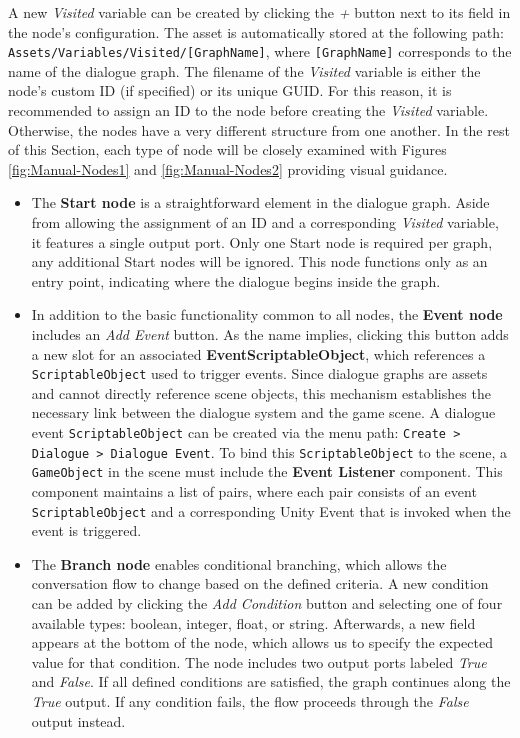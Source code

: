 A new \textit{Visited} variable can be created by clicking the \textit{+} button next to its field in the node's configuration. The asset is automatically stored at the following path: \verb|Assets/Variables/Visited/[GraphName]|, where \verb|[GraphName]| corresponds to the name of the dialogue graph. The filename of the \textit{Visited} variable is either the node’s custom ID (if specified) or its unique GUID. For this reason, it is recommended to assign an ID to the node before creating the \textit{Visited} variable. Otherwise, the nodes have a very different structure from one another. In the rest of this Section, each type of node will be closely examined with Figures \ref{fig:Manual-Nodes1} and \ref{fig:Manual-Nodes2} providing visual guidance.

\begin{itemize}
    \item The \textbf{Start node }is a straightforward element in the dialogue graph. Aside from allowing the assignment of an ID and a corresponding \textit{Visited} variable, it features a single output port. Only one Start node is required per graph, any additional Start nodes will be ignored. This node functions only as an entry point, indicating where the dialogue begins inside the graph.
    \item In addition to the basic functionality common to all nodes, the \textbf{Event node} includes an \textit{Add Event} button. As the name implies, clicking this button adds a new slot for an associated \textbf{EventScriptableObject}, which references a \verb|ScriptableObject| used to trigger events. Since dialogue graphs are assets and cannot directly reference scene objects, this mechanism establishes the necessary link between the dialogue system and the game scene. A dialogue event \verb|ScriptableObject| can be created via the menu path: \verb|Create > Dialogue > Dialogue Event|. To bind this \verb|ScriptableObject| to the scene, a \verb|GameObject| in the scene must include the \textbf{Event Listener} component. This component maintains a list of pairs, where each pair consists of an event \verb|ScriptableObject| and a corresponding Unity Event that is invoked when the event is triggered. 
    \item The \textbf{Branch node} enables conditional branching, which allows the conversation flow to change based on the defined criteria. A new condition can be added by clicking the \textit{Add Condition} button and selecting one of four available types: boolean, integer, float, or string. Afterwards, a new field appears at the bottom of the node, which allows us to specify the expected value for that condition. The node includes two output ports labeled \textit{True} and \textit{False}. If all defined conditions are satisfied, the graph continues along the \textit{True} output. If any condition fails, the flow proceeds through the \textit{False} output instead. 

\end{itemize}
